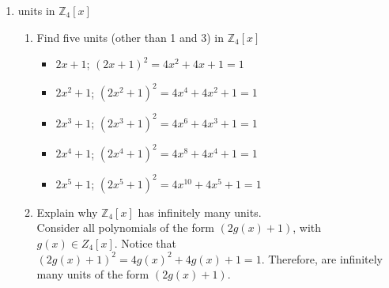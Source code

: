 \documentclass{article}
\newcommand{\Z}{\mathbb{Z}}
\begin{document}
\begin{enumerate}
\begin{enumerate}
			\item If $f(x)$ is monic, then $f(x)$ is not a zero divisor in $R[x]$
			\begin{proof}
				assume f(x) is monic.
				\begin{enumerate}[label=Case \arabic*:]
				\item $f(x)$ is monic and constant. $f(x)= 1_R$. Which is not a zero divisor.
				\item f(x) is monic and non-constant.
				Assume for the sake of contradiction that there exists $g(x) \not= 0_R$ such that $f(x)g(x)=0_R$. 
				From the above result the $\deg(f(x)g(x))>0$ which is contradicting the assumption that $f(x)g(x)=0_R$.
				thus $f(x)$ is not a zero divisor.
				\end{enumerate}
				Therefore the original statement holds. 
			\end{proof}
		\end{enumerate}

		\item units in $\Z_4[x]$ 
		\begin{enumerate}
			\item Find five units (other than 1 and 3) in $\Z_4[x]$ 
				\begin{itemize}
					\item $  2x+1$; $(2x  +1)^2 = 4x^2  +4x   +1 = 1$
					\item $2x^2+1$; $(2x^2+1)^2 = 4x^4  +4x^2 +1 = 1$
					\item $2x^3+1$; $(2x^3+1)^2 = 4x^6  +4x^3 +1 = 1$
					\item $2x^4+1$; $(2x^4+1)^2 = 4x^8  +4x^4 +1 = 1$
					\item $2x^5+1$; $(2x^5+1)^2 = 4x^{10} +4x^5 +1 = 1$
				\end{itemize}
			\item Explain why $\Z_4[x]$ has infinitely many units.\\
			Consider all polynomials of the form $(2g(x)+1)$, with $g(x) \in Z_4[x]$.
			Notice that $(2g(x)+1)^2 = 4g(x)^2 +4g(x)+1 = 1$. Therefore, are infinitely many units of the form $(2g(x)+1)$.   
				
		\end{enumerate}


\end{enumerate}
\end{document}
